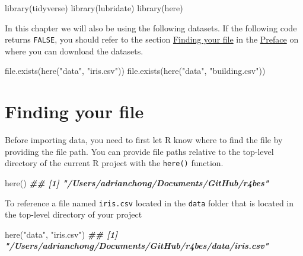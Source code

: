 \documentclass[
]{book}
\newenvironment{Shaded}{\begin{snugshade}}{\end{snugshade}}
\newcommand{\DocumentationTok}[1]{\textcolor[rgb]{0.56,0.35,0.01}{\textbf{\textit{#1}}}}
\newcommand{\FunctionTok}[1]{\textcolor[rgb]{0.00,0.00,0.00}{#1}}
\newcommand{\NormalTok}[1]{#1}
\newcommand{\StringTok}[1]{\textcolor[rgb]{0.31,0.60,0.02}{#1}}
\begin{document}
\begin{Shaded}
\begin{Highlighting}[]
\FunctionTok{library}\NormalTok{(tidyverse)}
\FunctionTok{library}\NormalTok{(lubridate)}
\FunctionTok{library}\NormalTok{(here)}
\end{Highlighting}
\end{Shaded}

In this chapter we will also be using the following datasets. If the following code returns \texttt{FALSE}, you should refer to the section \protect\hyperlink{finding-your-file}{Finding your file} in the \protect\hyperlink{preface}{Preface} on where you can download the datasets.

\begin{Shaded}
\begin{Highlighting}[]
\FunctionTok{file.exists}\NormalTok{(}\FunctionTok{here}\NormalTok{(}\StringTok{"data"}\NormalTok{, }\StringTok{"iris.csv"}\NormalTok{))}
\FunctionTok{file.exists}\NormalTok{(}\FunctionTok{here}\NormalTok{(}\StringTok{"data"}\NormalTok{, }\StringTok{"building.csv"}\NormalTok{))}
\end{Highlighting}
\end{Shaded}

\hypertarget{finding-your-file}{%
\section{Finding your file}\label{finding-your-file}}

Before importing data, you need to first let R know where to find the file by providing the file path. You can provide file paths relative to the top-level directory of the current R project with the \texttt{here()} function.

\begin{Shaded}
\begin{Highlighting}[]
\FunctionTok{here}\NormalTok{()}
\DocumentationTok{\#\# [1] "/Users/adrianchong/Documents/GitHub/r4bes"}
\end{Highlighting}
\end{Shaded}

To reference a file named \texttt{iris.csv} located in the \texttt{data} folder that is located in the top-level directory of your project

\begin{Shaded}
\begin{Highlighting}[]
\FunctionTok{here}\NormalTok{(}\StringTok{"data"}\NormalTok{, }\StringTok{"iris.csv"}\NormalTok{)}
\DocumentationTok{\#\# [1] "/Users/adrianchong/Documents/GitHub/r4bes/data/iris.csv"}
\end{Highlighting}
\end{Shaded}
\end{document}
